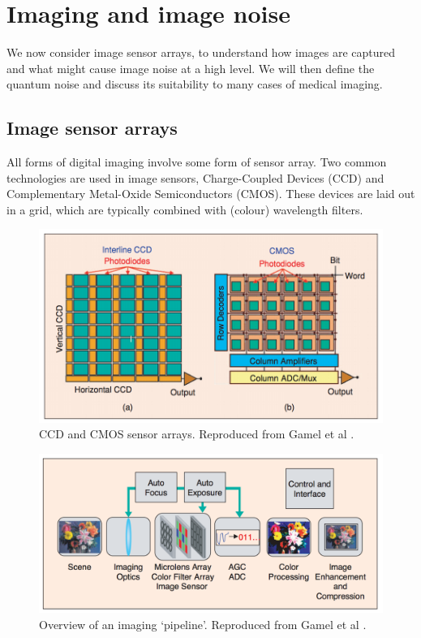 \documentclass[12pt,twoside,notitlepage]{report}
\begin{document}
\cleardoublepage
\chapter{Imaging and image noise} \label{app:img_noise}
    We now consider image sensor arrays, to understand how images are captured and what might 
    cause image noise at a high level. We will then define the quantum noise and discuss its suitability to many 
    cases of medical imaging. 

    \section{Image sensor arrays}
        All forms of digital imaging involve some form of sensor array. Two common technologies are used in image 
        sensors, Charge-Coupled Devices (CCD) and Complementary Metal-Oxide Semiconductors (CMOS). These devices are 
        laid out in a grid, which are typically combined with (colour) wavelength filters. 

        \begin{figure}[H]
            \centering
            \includegraphics[scale=0.30]{sensor_arrays}
            \caption[CCD and CMOS sensor arrays.]{CCD and CMOS sensor arrays. Reproduced from Gamel et al \cite{gamal2005cmos}.}
            \label{fig:image_pipeline}
        \end{figure}

        \begin{figure}[H]
            \centering
            \includegraphics[scale=0.30]{imaging_pipeline}
            \caption[Overview of an imaging `pipeline'.]{Overview of an imaging `pipeline'. Reproduced from Gamel et al \cite{gamal2005cmos}.}
            \label{fig:image_pipeline}
        \end{figure}
\end{document}
